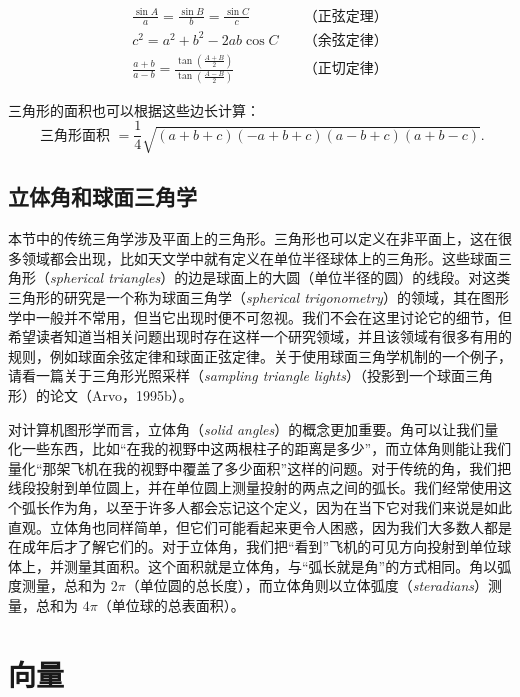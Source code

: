 \documentclass[lang=cn,12pt,marginpar=margintrue]{elegantbook}
\begin{document}
\[
  \begin{aligned}
    \frac{\sin A}{a}=\frac{\sin B}{b}=\frac{\sin C}{c}\quad                                      & \text{（正弦定理）} \\
    c^{2}=a^{2}+b^{2}-2 a b \cos C\quad                                                          & \text{（余弦定律）} \\
    \frac{a+b}{a-b}=\frac{\tan \left(\frac{A+B}{2}\right)}{\tan \left(\frac{A-B}{2}\right)}\quad & \text{（正切定律）}
  \end{aligned}
\]

三角形的面积也可以根据这些边长计算：
\[
  \text { 三角形面积 }=\frac{1}{4} \sqrt{(a+b+c)(-a+b+c)(a-b+c)(a+b-c)} .
\]

\subsection{立体角和球面三角学}

本节中的传统三角学涉及平面上的三角形。三角形也可以定义在非平面上，这在很多领域都会出现，比如天文学中就有定义在单位半径球体上的三角形。这些球面三角形（\textit{spherical triangles}）的边是球面上的大圆（单位半径的圆）的线段。对这类三角形的研究是一个称为球面三角学（\textit{spherical trigonometry}）的领域，其在图形学中一般并不常用，但当它出现时便不可忽视。我们不会在这里讨论它的细节，但希望读者知道当相关问题出现时存在这样一个研究领域，并且该领域有很多有用的规则，例如球面余弦定律和球面正弦定律。关于使用球面三角学机制的一个例子，请看一篇关于三角形光照采样（\textit{sampling triangle lights}）（投影到一个球面三角形）的论文（Arvo，1995b）。

对计算机图形学而言，立体角（\textit{solid angles}）的概念更加重要。角可以让我们量化一些东西，比如“在我的视野中这两根柱子的距离是多少”，而立体角则能让我们量化“那架飞机在我的视野中覆盖了多少面积”这样的问题。对于传统的角，我们把线段投射到单位圆上，并在单位圆上测量投射的两点之间的弧长。我们经常使用这个弧长作为角，以至于许多人都会忘记这个定义，因为在当下它对我们来说是如此直观。立体角也同样简单，但它们可能看起来更令人困惑，因为我们大多数人都是在成年后才了解它们的。对于立体角，我们把“看到”飞机的可见方向投射到单位球体上，并测量其面积。这个面积就是立体角，与“弧长就是角”的方式相同。角以弧度测量，总和为 $2\pi$（单位圆的总长度），而立体角则以立体弧度（\textit{steradians}）测量，总和为 $4\pi$（单位球的总表面积）。

\section{向量}
\end{document}
